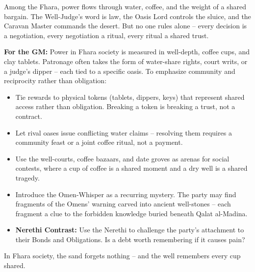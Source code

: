 \begin{tcolorbox}[colback=black!3,colframe=black!40!white,title={Patronage \& Power},breakable]
Among the Fhara, power flows through water, coffee, and the weight of a shared bargain. The Well-Judge's word is law, the Oasis Lord controls the sluice, and the Caravan Master commands the desert. But no one rules alone -- every decision is a negotiation, every negotiation a ritual, every ritual a shared trust.

\textbf{For the GM:}  
Power in Fhara society is measured in well-depth, coffee cups, and clay tablets. Patronage often takes the form of water-share rights, court writs, or a judge's dipper -- each tied to a specific oasis. To emphasize community and reciprocity rather than obligation:
\begin{itemize}
\item Tie rewards to physical tokens (tablets, dippers, keys) that represent shared access rather than obligation. Breaking a token is breaking a trust, not a contract.
\item Let rival oases issue conflicting water claims -- resolving them requires a community feast or a joint coffee ritual, not a payment.
\item Use the well-courts, coffee bazaars, and date groves as arenas for social contests, where a cup of coffee is a shared moment and a dry well is a shared tragedy.
\item Introduce the Omen-Whisper as a recurring mystery. The party may find fragments of the Omens' warning carved into ancient well-stones -- each fragment a clue to the forbidden knowledge buried beneath Qalat al-Madina.
\item \textbf{Nerethi Contrast:} Use the Nerethi to challenge the party's attachment to their Bonds and Obligations. Is a debt worth remembering if it causes pain?
\end{itemize}
In Fhara society, the sand forgets nothing -- and the well remembers every cup shared.
\end{tcolorbox}


